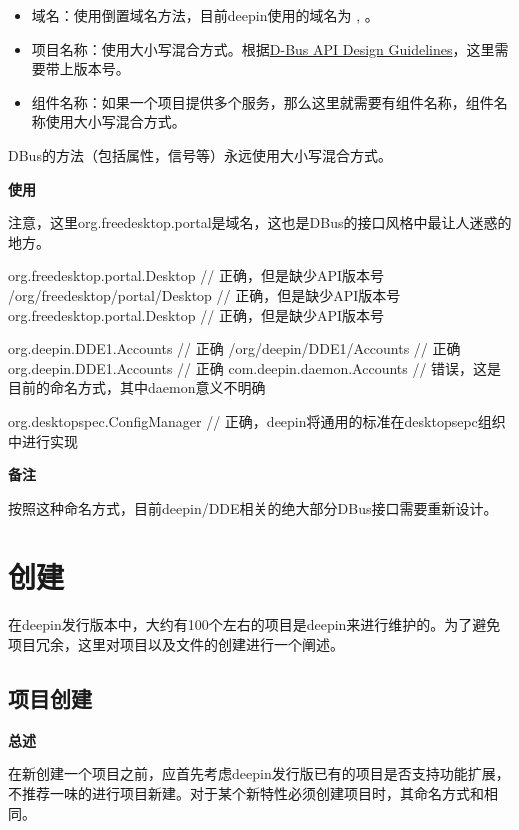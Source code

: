 \begin{itemize}
  \item 域名：使用倒置域名方法，目前deepin使用的域名为 ,  。
  \item 项目名称：使用大小写混合方式。根据\href{https://dbus.freedesktop.org/doc/dbus-api-design.html}{D-Bus API Design Guidelines}，这里需要带上版本号。
  \item 组件名称：如果一个项目提供多个服务，那么这里就需要有组件名称，组件名称使用大小写混合方式。
\end{itemize}

DBus的方法（包括属性，信号等）永远使用大小写混合方式。

\textbf{使用}

注意，这里org.freedesktop.portal是域名，这也是DBus的接口风格中最让人迷惑的地方。

\begin{cppcode}
  org.freedesktop.portal.Desktop      // 正确，但是缺少API版本号
  /org/freedesktop/portal/Desktop     // 正确，但是缺少API版本号
  org.freedesktop.portal.Desktop      // 正确，但是缺少API版本号
\end{cppcode}

\begin{cppcode}
  org.deepin.DDE1.Accounts       // 正确
  /org/deepin/DDE1/Accounts      // 正确
  org.deepin.DDE1.Accounts       // 正确
  com.deepin.daemon.Accounts     // 错误，这是目前的命名方式，其中daemon意义不明确

  org.desktopspec.ConfigManager  // 正确，deepin将通用的标准在desktopsepc组织中进行实现

\end{cppcode}


\textbf{备注}

按照这种命名方式，目前deepin/DDE相关的绝大部分DBus接口需要重新设计。

\chapter{创建}

在deepin发行版本中，大约有100个左右的项目是deepin来进行维护的。为了避免项目冗余，这里对项目以及文件的创建进行一个阐述。

\section{项目创建}

\textbf{总述}

在新创建一个项目之前，应首先考虑deepin发行版已有的项目是否支持功能扩展，不推荐一味的进行项目新建。对于某个新特性必须创建项目时，其命名方式和相同。

